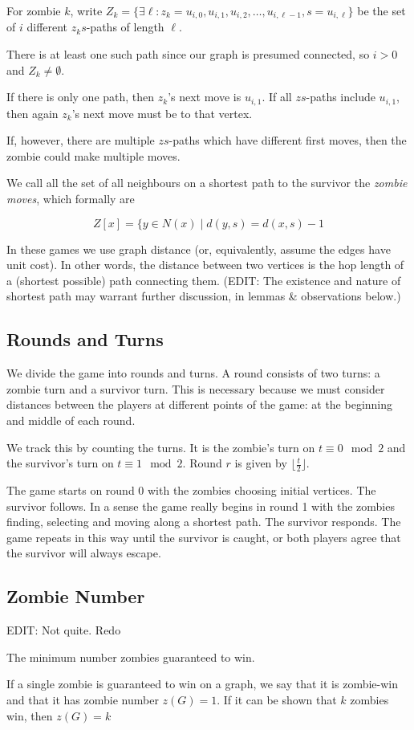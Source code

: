 For zombie $k$, write
$Z_k = \{  \exists \ell : z_k = u_{i,0}, u_{i, 1}, u_{i, 2}, \dots, u_{i, \ell-1}, s= u_{i, \ell}\}$ be the set of $i$ different $z_ks$-paths of length $\ell$.

There is at least one such path since our graph is presumed connected,
so $i > 0$ and $Z_k \neq \emptyset$.

If there is only one path, then $z_k$'s next move is $u_{i, 1}$. If all $zs$-paths
include $u_{i,1}$, then again $z_k$'s next move must be to that vertex.

If, however, there are multiple $zs$-paths which have different first moves,
then the zombie could make multiple moves.

We call all the set of all neighbours on
a shortest path to the survivor the \textit{zombie moves}, which formally are

\[ Z[x] = \{ y \in N(x) \mid d(y, s) = d(x, s) - 1 \]

In these games we use graph distance (or, equivalently, assume the edges have unit cost).
In other words, the distance between two vertices is the hop length of a (shortest possible) path
connecting them.
(EDIT: The existence and nature of shortest path may warrant further discussion, in lemmas \& observations below.)


\subsection{Rounds and Turns}
We divide the game into rounds and turns. A round consists of two turns:
a zombie turn and a survivor turn. This is necessary because we must
consider distances between the players at different points of the game:
at the beginning and middle of each round.

We track this by counting the turns. It is the zombie's turn
on $t \equiv 0 \mod{2}$ and the survivor's turn on $t \equiv 1 \mod{2}$.
Round $r$ is given by $\lfloor \frac{t}{2} \rfloor$.

The game starts on round 0 with the zombies choosing
initial vertices. The survivor follows. In a sense the game really begins in
round 1 with the zombies finding, selecting and moving along a shortest path.
The survivor responds. The game repeats in this way until the survivor is caught,
or both players agree that the survivor will always escape.

\subsection{Zombie Number}

EDIT: Not quite. Redo

The minimum number zombies guaranteed to win.

If a single zombie is guaranteed to win on a graph, we say that it is zombie-win
and that it has zombie number $z(G) = 1$. If it can be shown that $k$ zombies win,
then $z(G) = k$
